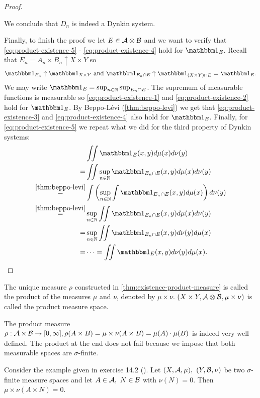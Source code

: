 \begin{proof}
\begin{enumerate}
		We conclude that $D_n$ is indeed a Dynkin system.
	\end{enumerate}

	Finally, to finish the proof we let $E \in \mathcal{A} \otimes \mathcal{B}$ and we want to verify that \ref{eq:product-existence-5} - \ref{eq:product-existence-4} hold for $\ind_E$. Recall that $E_n = A_n \times B_n \uparrow X \times Y$ so
	\begin{align*}
		\ind_{E_n} \uparrow \ind_{X \times Y} \text{ and } \ind_{E_n \cap E} \uparrow \ind_{(X \times Y) \cap E} = \ind_E.
	\end{align*}
	We may write $\ind_E = \sup_{n \in \N} \sup_{E_n \cap E}$. The supremum of measurable functions is measurable so \ref{eq:product-existence-1} and \ref{eq:product-existence-2} hold for $\ind_E$. By Beppo-Lévi (\autoref{thm:beppo-levi}) we get that \ref{eq:product-existence-3} and \ref{eq:product-existence-4} also hold for $\ind_E$. Finally, for \ref{eq:product-existence-5} we repeat what we did for the third property of Dynkin systems:
	\begin{align*}
		&\iint \ind_E (x, y)d\mu(x)d\nu(y)\\
		= & \iint \sup_{n\in \N} \ind_{E_n \cap E}(x, y) d\mu(x) d\nu(y)\\
		\overset{\ref{thm:beppo-levi}}{=} & \int \left( \sup_{n\in \N} \int \ind_{E_n \cap E}(x, y) d\mu(x) \right) d\nu(y)\\
		\overset{\ref{thm:beppo-levi}}{=} & \sup_{n\in\N} \iint \ind_{E_n \cap E}(x, y) d\mu(x) d\nu(y)\\
		= &\sup_{n\in\N} \iint \ind_{E_n \cap E}(x, y) d\nu(y) d\mu(x)\\
		= &\dots = \iint \ind_E(x, y)d\nu(y)d\mu(x).
	\end{align*}
\end{proof}

\begin{dfn}
	The unique measure $\rho$ constructed in \autoref{thm:existence-product-measure} is called the product of the measures $\mu$ and $\nu$, denoted by $\mu \times \nu$. $(X \times Y, \mathcal{A} \otimes \mathcal{B}, \mu \times \nu)$ is called the product measure space.
\end{dfn}

\begin{remark}
	The product measure $\rho: \mathcal{A} \times \mathcal{B} \to [0,\infty], \rho(A \times B) = \mu \times \nu(A \times B) = \mu(A) \cdot \mu(B)$ is indeed very well defined. The product at the end does not fail because we impose that both measurable spaces are $\sigma$-finite.
	
	Consider the example given in exercise 14.2 (\cite[p. 149]{schilling2017}). Let $(X, \mathcal{A}, \mu),\ (Y, \mathcal{B}, \nu)$ be two $\sigma$-finite measure spaces and let $A \in \mathcal{A},\ N \in \mathcal{B}$ with $\nu(N) = 0$. Then $\mu \times \nu(A \times N) = 0$.
\end{remark}

